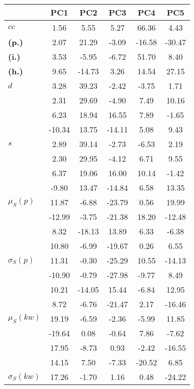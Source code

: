 \begin{table}[h!]
\begin{center}
\begin{tabular}{| l || c | c | c | c | c |}\hline
 & {\bf PC1} & {\bf PC2} & {\bf PC3} & {\bf PC4} & {\bf PC5} \\\hline\hline
{\bf $cc$} & 1.56 & 5.55 & 5.27 & 66.36 & 4.43 \\
{\bf (p.)} & 2.07 & 21.29 & -3.09 & -16.58 & -30.47 \\
{\bf (i.)} & 3.53 & -5.95 & -6.72 & 51.70 & 8.40 \\
{\bf (h.)} & 9.65 & -14.73 & 3.26 & 14.54 & 27.15 \\\hline
{\bf $d$} & 3.28 & 39.23 & -2.42 & -3.75 & 1.71 \\
{\bf } & 2.31 & 29.69 & -4.90 & 7.49 & 10.16 \\
{\bf } & 6.23 & 18.94 & 16.55 & 7.89 & -1.65 \\
{\bf } & -10.34 & 13.75 & -14.11 & 5.08 & 9.43 \\\hline
{\bf $s$} & 2.89 & 39.14 & -2.73 & -6.53 & 2.19 \\
{\bf } & 2.30 & 29.95 & -4.12 & 6.71 & 9.55 \\
 & 6.37  & 19.06  & 16.00  & 10.14  & -1.42 \\
 & -9.80  & 13.47  & -14.84  & 6.58  & 13.35 \\\hline
$\mu_S(p)$ & 11.87  & -6.88  & -23.79  & 0.56  & 19.99 \\
 & -12.99  & -3.75  & -21.38  & 18.20  & -12.48 \\
 & 8.32  & -18.13  & 13.89  & 6.33  & -6.38 \\
 & 10.80  & -6.99  & -19.67  & 0.26  & 6.55 \\\hline
$\sigma_S(p)$ & 11.31  & -0.30  & -25.29  & 10.55  & -14.13 \\
 & -10.90  & -0.79  & -27.98  & -9.77  & 8.49 \\
 & 10.21  & -14.05  & 15.44  & -6.84  & 12.95 \\
 & 8.72  & -6.76  & -21.47  & 2.17  & -16.46 \\\hline
$\mu_S(kw)$ & 19.19  & -6.59  & -2.36  & -5.99  & 11.85 \\
 & -19.64  & 0.08  & -0.64  & 7.86  & -7.62 \\
 & 17.95  & -8.73  & 0.93  & -2.42  & -16.55 \\
 & 14.15  & 7.50  & -7.33  & -20.52  & 6.85 \\\hline
$\sigma_S(kw)$ & 17.26  & -1.70  & 1.16  & 0.48  & -24.22 \\

\end{tabular}
\end{center}
\end{table}
